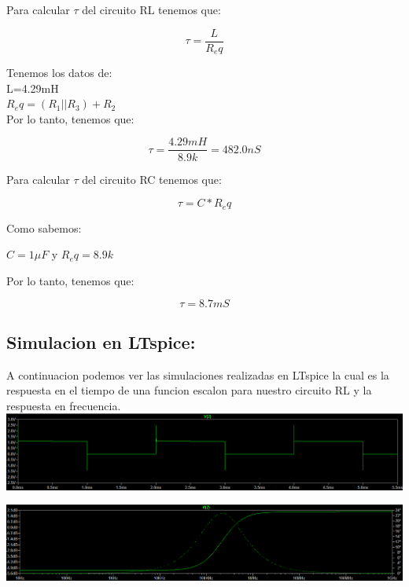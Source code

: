 \documentclass[12pt,letterpaper]{IEEEtran}
\begin{document}
	Para calcular $\tau$ del circuito RL tenemos que:
	
	$$\tau=\frac{L}{R_eq}$$
	
	Tenemos los datos de:\\
	L=4.29mH \\
	$R_eq=(R_1||R_3)+R_2$\\
	Por lo tanto, tenemos que:
	
	$$\tau=\frac{4.29mH}{8.9k}=482.0n S$$
	
	
	Para calcular $\tau$ del circuito RC tenemos que:
	
	$$\tau=C*R_eq$$
	
	
	Como sabemos:
	
	$C=1\mu F$ y $R_eq=8.9k$
	
	Por lo tanto, tenemos que:
	
	$$\tau=8.7mS$$
	
	\subsection{\textbf{Simulacion en LTspice:}}
	\begin{center}
		A continuacion podemos ver las simulaciones realizadas en LTspice la cual es la respuesta en el tiempo de una funcion escalon para nuestro circuito RL y la respuesta en frecuencia.\\
		
		\includegraphics[width=0.8\linewidth]{escalon}
		
	\end{center}
	\begin{center}
		
		\includegraphics[width=0.8\linewidth]{frecuenciaRL}
		
	\end{center}
	
	
\end{document}
